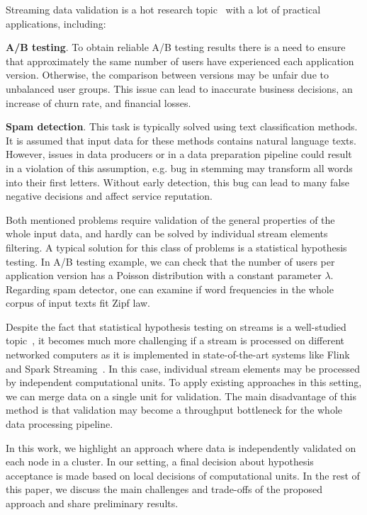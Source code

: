 \label {fs-short-intro}

Streaming data validation is a hot research topic~\cite{Xu:2013:MVS:2488222.2488275, frank2018semantic} with a lot of practical applications, including:

{\bf A/B testing}. To obtain reliable A/B testing results there is a need to ensure that approximately the same number of users have experienced each application version. Otherwise, the comparison between versions may be unfair due to unbalanced user groups. This issue can lead to inaccurate business decisions, an increase of churn rate, and financial losses.
    
{\bf Spam detection}. This task is typically solved using text classification methods. It is assumed that input data for these methods contains natural language texts. However, issues in data producers or in a data preparation pipeline could result in a violation of this assumption, e.g. bug in stemming may transform all words into their first letters. Without early detection, this bug can lead to many false negative decisions and affect service reputation.

Both mentioned problems require validation of the general properties of the whole input data, and hardly can be solved by individual stream elements filtering. A typical solution for this class of problems is a statistical hypothesis testing. In A/B testing example, we can check that the number of users per application version has a Poisson distribution with a constant parameter $\lambda$. Regarding spam detector, one can examine if word frequencies in the whole corpus of input texts fit Zipf law. 

Despite the fact that statistical hypothesis testing on streams is a well-studied topic~\cite{kifer2004detecting, lall2015data}, it becomes much more challenging if a stream is processed on different networked computers as it is implemented in state-of-the-art systems like Flink~\cite{Carbone:2017:SMA:3137765.3137777} and Spark Streaming~\cite{Zaharia:2012:DSE:2342763.2342773}. In this case, individual stream elements may be processed by independent computational units. To apply existing approaches in this setting, we can merge data on a single unit for validation. The main disadvantage of this method is that validation may become a throughput bottleneck for the whole data processing pipeline. 

In this work, we highlight an approach where data is independently validated on each node in a cluster. In our setting, a final decision about hypothesis acceptance is made based on local decisions of computational units. In the rest of this paper, we discuss the main challenges and trade-offs of the proposed approach and share preliminary results.